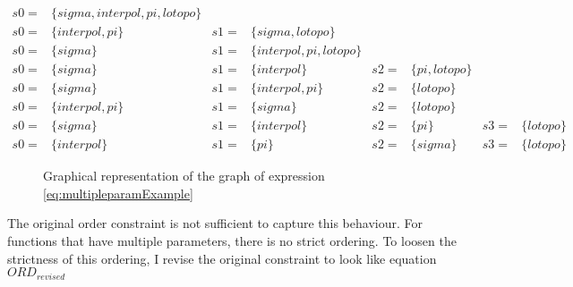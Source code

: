 \documentclass{article}
\begin{document}
\begin{align}
   s0=& \{sigma,interpol,pi,lotopo\} &   &                 &   &   \\
   s0=& \{interpol,pi\}          & s1=& \{sigma,lotopo\}    &   &   \\
   s0=& \{sigma\}  & s1=&\{interpol,pi,lotopo \} \\
   s0=& \{sigma\} & s1=&\{ interpol\} & s2=&\{pi,lotopo \} \\
   s0=& \{sigma\} & s1=&\{ interpol,pi\} & s2=&\{lotopo \} \\
   s0=& \{interpol,pi\} & s1=&\{sigma \} & s2=&\{lotopo \} \\
   s0=& \{sigma\} & s1=&\{ interpol\} & s2=&\{pi\} & s3=&\{lotopo \} \\
   s0=&\{ interpol\}& s1=&\{pi\} &s2=& \{sigma\} & s3=&\{lotopo \}
\end{align}

 \begin{figure}
    \centering
   
    
    \caption{Graphical representation of the graph of expression \ref{eq:multipleparamExample}}
    \label{fig:smallGataGraph2}
\end{figure}
 
The original order constraint is not sufficient to capture this behaviour. For functions that have multiple parameters, there is no strict ordering. To loosen the strictness of this ordering, I revise the original constraint to look like equation $ORD_{revised}$
\end{document}
